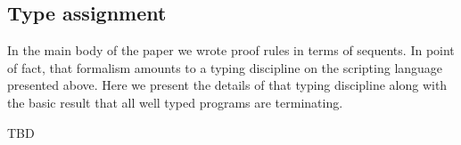 \documentclass[]{acm_proc_article-sp}
\numberwithin{equation}{subsection}
\begin{document}
\begin{mathpar}
\end{mathpar}

\subsection{Type assignment}

In the main body of the paper we wrote proof rules in terms of
sequents. In point of fact, that formalism amounts to a typing
discipline on the scripting language presented above. Here we present
the details of that typing discipline along with the basic result that
all well typed programs are terminating.

TBD

\end{document}
